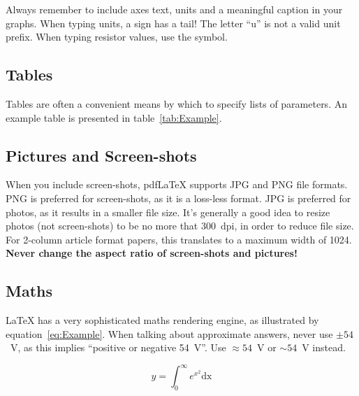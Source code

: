 
Always remember to include axes text, units and a meaningful caption in your graphs.  When typing units, a \micro{} sign has a tail!  The letter ``u'' is not a valid unit prefix.  When typing resistor values, use the \Ohm{} symbol.

\subsection{Tables}
Tables are often a convenient means by which to specify lists of parameters.  An example table is presented in table~\ref{tab:Example}.


\subsection{Pictures and Screen-shots}
When you include screen-shots, pdf\LaTeX{} supports JPG and PNG file formats.  PNG is preferred for screen-shots, as it is a loss-less format.  JPG is preferred for photos, as it results in a smaller file size.  It's generally a good idea to resize photos (not screen-shots) to be no more that 300~dpi, in order to reduce file size.  For 2-column article format papers, this translates to a maximum width of 1024.  \textbf{Never change the aspect ratio of screen-shots and pictures!}

\subsection{Maths}
\LaTeX{} has a very sophisticated maths rendering engine, as illustrated by equation~\ref{eq:Example}.  When talking about approximate answers, never use $\pm{54}$~V, as this implies ``positive or negative 54~V''.  Use $\approx{54}$~V or $\sim{54}$~V instead.

\begin{equation}
 y = \int_0^\infty e^{x^2} \mathrm{dx}
 \label{eq:Example}
\end{equation}


